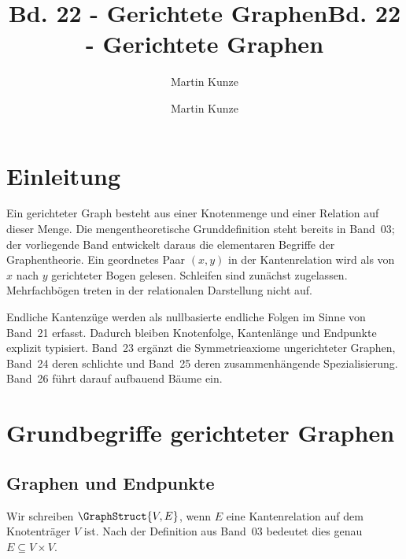 \documentclass[main.tex]{subfiles}
\title{Bd. 22 - Gerichtete Graphen}
\author{Martin Kunze}
\date{}
\begin{document}
\title{Bd. 22 - Gerichtete Graphen}
\author{Martin Kunze}
\date{}
\hypersetup{pageanchor=false}
\maketitle
\hypersetup{pageanchor=true}
\setcounter{tocdepth}{3}
\tableofcontents
\setcounter{file}{22}
\renewcommand{\FormulaBandID}{22}

\chapter{Einleitung}

Ein gerichteter Graph besteht aus einer Knotenmenge und einer Relation auf
dieser Menge. Die mengentheoretische Grunddefinition steht bereits in
Band~03; der vorliegende Band entwickelt daraus die elementaren Begriffe der
Graphentheorie. Ein geordnetes Paar \((x,y)\) in der Kantenrelation wird als
von \(x\) nach \(y\) gerichteter Bogen gelesen. Schleifen sind zunächst
zugelassen. Mehrfachbögen treten in der relationalen Darstellung nicht auf.

Endliche Kantenzüge werden als nullbasierte endliche Folgen im Sinne von
Band~21 erfasst. Dadurch bleiben Knotenfolge, Kantenlänge und Endpunkte
explizit typisiert. Band~23 ergänzt die Symmetrieaxiome ungerichteter Graphen,
Band~24 deren schlichte und Band~25 deren zusammenhängende Spezialisierung.
Band~26 führt darauf aufbauend Bäume ein.

\chapter{Grundbegriffe gerichteter Graphen}

\section{Graphen und Endpunkte}

Wir schreiben \(\GraphStruct{V,E}\), wenn \(E\) eine Kantenrelation auf
dem Knotenträger \(V\) ist. Nach der Definition aus Band~03 bedeutet dies
genau \(E\subseteq V\times V\).

\begin{tabproof}
\end{tabproof}
\end{document}
